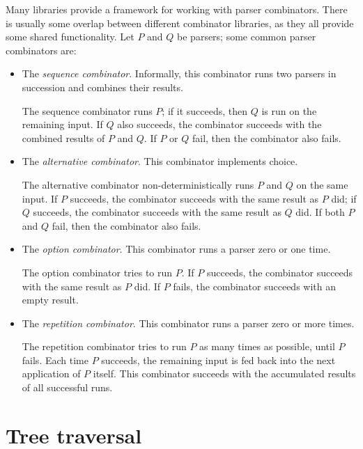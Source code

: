 \documentclass[UdineBachThesis,american,11pt]{PhdThesis}
\begin{document}
  Many libraries provide a framework for working with parser combinators. There
  is usually some overlap between different combinator libraries, as they all
  provide some shared functionality. Let $P$ and $Q$ be parsers; some common
  parser combinators are:

  \begin{itemize}
    \item The \emph{sequence combinator}. Informally, this combinator runs two
    parsers in succession and combines their results.

    The sequence combinator runs $P$; if it succeeds, then $Q$ is run on the
    remaining input. If $Q$ also succeeds, the combinator succeeds with the
    combined results of $P$ and $Q$\@. If $P$ or $Q$ fail, then the combinator
    also fails.

    \item The \emph{alternative combinator}. This combinator implements choice.

    The alternative combinator non-deterministically runs $P$ and $Q$ on the
    same input. If $P$ succeeds, the combinator succeeds with the same result as
    $P$ did; if $Q$ succeeds, the combinator succeeds with the same result as
    $Q$ did. If both $P$ and $Q$ fail, then the combinator also fails.

    \item The \emph{option combinator}. This combinator runs a parser zero or
    one time.

    The option combinator tries to run $P$\@. If $P$ succeeds, the combinator
    succeeds with the same result as $P$ did. If $P$ fails, the combinator
    succeeds with an empty result.

    \item The \emph{repetition combinator}. This combinator runs a parser zero
    or more times.

    The repetition combinator tries to run $P$ as many times as possible, until
    $P$ fails. Each time $P$ succeeds, the remaining input is fed back into the
    next application of $P$ itself. This combinator succeeds with the
    accumulated results of all successful runs.
  \end{itemize}

  \newpage

  \section{Tree traversal}
\end{document}
